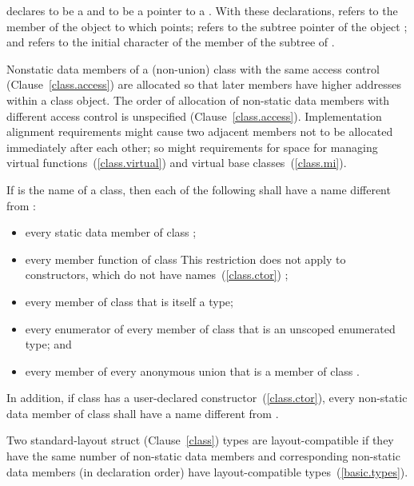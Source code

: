 declares  to be a  and  to be a pointer
to a . With these declarations,  refers to
the  member of the object to which  points;
 refers to the  subtree pointer of the object
; and  refers to the initial character
of the  member of the  subtree of .
\exitexample

\pnum
{}%
Nonstatic data members of a (non-union) class
with the same access control (Clause~\ref{class.access})
are allocated so that later
members have higher addresses within a class object.
%
The order of allocation of non-static data members
with different access control
is unspecified (Clause~\ref{class.access}).
Implementation alignment requirements might cause two adjacent members
not to be allocated immediately after each other; so might requirements
for space for managing virtual functions~(\ref{class.virtual}) and
virtual base classes~(\ref{class.mi}).

\pnum
If  is the name of a class, then each of the following shall
have a name different from :

\begin{itemize}
\item every static data member of class ;

\item every member function of class 
\enternote
This restriction does not apply to constructors, which do not have
names~(\ref{class.ctor})
\exitnote;

\item every member of class  that is itself a type;

\item every enumerator of every member of class  that is an
unscoped enumerated type; and

\item every member of every anonymous union that is a member of class
.
\end{itemize}

\pnum
In addition, if class  has a user-declared
constructor~(\ref{class.ctor}), every non-static data member of class
 shall have a name different from .

\pnum
Two standard-layout struct (Clause~\ref{class}) types are layout-compatible if they
have the same number of non-static data members and corresponding
non-static data members (in declaration order) have layout-compatible
types~(\ref{basic.types}).

